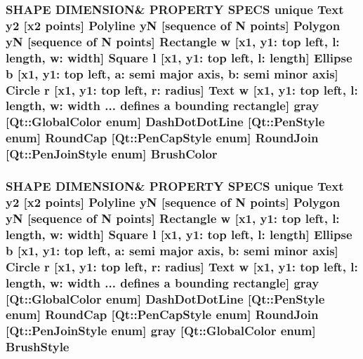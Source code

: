 \subsubsection[{\texorpdfstring{Brush\+Color}{BrushColor}}]{\setlength{\rightskip}{0pt plus 5cm}S\+H\+A\+PE D\+I\+M\+E\+N\+S\+I\+ON\& P\+R\+O\+P\+E\+R\+TY S\+P\+E\+CS unique {\bf Text} {\bf y2} \mbox{[}{\bf x2} points\mbox{]} {\bf Polyline} yN \mbox{[}sequence of N points\mbox{]} {\bf Polygon} yN \mbox{[}sequence of N points\mbox{]} {\bf Rectangle} w \mbox{[}{\bf x1}, y1\+: top left, l\+: length, w\+: width\mbox{]} {\bf Square} {\bf l} \mbox{[}{\bf x1}, y1\+: top left, l\+: length\mbox{]} {\bf Ellipse} b \mbox{[}{\bf x1}, y1\+: top left, a\+: semi major axis, b\+: semi minor axis\mbox{]} {\bf Circle} r \mbox{[}{\bf x1}, y1\+: top left, r\+: radius\mbox{]} {\bf Text} w \mbox{[}{\bf x1}, y1\+: top left, l\+: length, w\+: width ... defines {\bf a} bounding rectangle\mbox{]} gray \mbox{[}Qt\+::\+Global\+Color enum\mbox{]} Dash\+Dot\+Dot\+Line \mbox{[}Qt\+::\+Pen\+Style enum\mbox{]} Round\+Cap \mbox{[}{\bf Qt\+::\+Pen\+Cap\+Style} enum\mbox{]} Round\+Join \mbox{[}{\bf Qt\+::\+Pen\+Join\+Style} enum\mbox{]} Brush\+Color}\hypertarget{shape__input__file__specs_8txt_a354fc5430ab296aed56472b5bd70b09e}{}\label{shape__input__file__specs_8txt_a354fc5430ab296aed56472b5bd70b09e}
\subsubsection[{\texorpdfstring{Brush\+Style}{BrushStyle}}]{\setlength{\rightskip}{0pt plus 5cm}S\+H\+A\+PE D\+I\+M\+E\+N\+S\+I\+ON\& P\+R\+O\+P\+E\+R\+TY S\+P\+E\+CS unique {\bf Text} {\bf y2} \mbox{[}{\bf x2} points\mbox{]} {\bf Polyline} yN \mbox{[}sequence of N points\mbox{]} {\bf Polygon} yN \mbox{[}sequence of N points\mbox{]} {\bf Rectangle} w \mbox{[}{\bf x1}, y1\+: top left, l\+: length, w\+: width\mbox{]} {\bf Square} {\bf l} \mbox{[}{\bf x1}, y1\+: top left, l\+: length\mbox{]} {\bf Ellipse} b \mbox{[}{\bf x1}, y1\+: top left, a\+: semi major axis, b\+: semi minor axis\mbox{]} {\bf Circle} r \mbox{[}{\bf x1}, y1\+: top left, r\+: radius\mbox{]} {\bf Text} w \mbox{[}{\bf x1}, y1\+: top left, l\+: length, w\+: width ... defines {\bf a} bounding rectangle\mbox{]} gray \mbox{[}Qt\+::\+Global\+Color enum\mbox{]} Dash\+Dot\+Dot\+Line \mbox{[}Qt\+::\+Pen\+Style enum\mbox{]} Round\+Cap \mbox{[}{\bf Qt\+::\+Pen\+Cap\+Style} enum\mbox{]} Round\+Join \mbox{[}{\bf Qt\+::\+Pen\+Join\+Style} enum\mbox{]} gray \mbox{[}Qt\+::\+Global\+Color enum\mbox{]} Brush\+Style}\hypertarget{shape__input__file__specs_8txt_ad07f6fe6c28dcb0b3bdc324a72d0051f}{}\label{shape__input__file__specs_8txt_ad07f6fe6c28dcb0b3bdc324a72d0051f}
